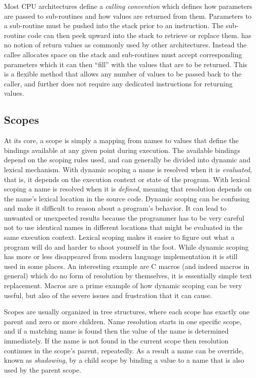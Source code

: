 Most CPU architectures define a \textit{calling convention} which defines how
parameters are passed to sub-routines and how values are returned from
them. Parameters to a sub-routine must be pushed into the stack prior to an
 instruction. The sub-routine code can then peek upward into the
stack to retrieve or replace them. \thename{} has no notion of return values as
commonly used by other architectures. Instead the callee allocates space on the
stack and sub-routines must accept corresponding parameters which it can then
``fill'' with the values that are to be returned. This is a flexible method that
allows any number of values to be passed back to the caller, and further does
not require any dedicated instructions for returning values.

\subsection{Scopes}
\label{sec:design:scopes}

At its core, a scope is simply a mapping from names to values that define the
bindings available at any given point during execution. The available bindings
depend on the scoping rules used, and can generally be divided into dynamic and
lexical mechanism. With dynamic scoping a name is resolved when it is
\emph{evaluated}, that is, it depends on the execution context or state of the
program. With lexical scoping a name is resolved when it is \emph{defined},
meaning that resolution depends on the name's lexical location in the source
code. Dynamic scoping can be confusing and make it difficult to reason about a
program's behavior. It can lead to unwanted or unexpected results because the
programmer has to be very careful not to use identical names in different
locations that might be evaluated in the same execution context. Lexical scoping
makes it easier to figure out what a program will do and harder to shoot
yourself in the foot. While dynamic scoping has more or less disappeared from
modern language implementation\cite{cse341} it is still used in some places. An
interesting example are C macros (and indeed macros in general) which do no form
of resolution by themselves, it is essentially simple text replacement. Macros
are a prime example of how dynamic scoping can be very useful, but also of the
severe issues and frustration that it can cause.

Scopes are usually organized in tree structures, where each scope has exactly
one parent and zero or more children. Name resolution starts in one specific
scope, and if a matching name is found then the value of the name is determined
immediately. If the name is not found in the current scope then resolution
continues in the scope's parent, repeatedly. As a result a name can be override,
known as \textit{shadowing}, by a child scope by binding a value to a name that
is also used by the parent scope.

